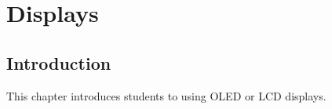 \chapter{Displays}

\section{Introduction}
This chapter introduces students to using OLED or LCD displays.
